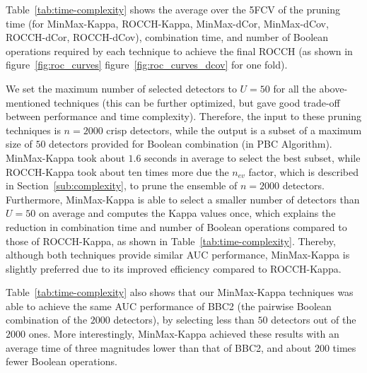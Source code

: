 Table~\ref{tab:time-complexity} shows the average over the 5FCV of the  pruning time (for MinMax-Kappa,  ROCCH-Kappa, MinMax-dCor, MinMax-dCov, ROCCH-dCor, ROCCH-dCov), combination time, and number of Boolean operations required by each technique to achieve the final ROCCH (as shown in  figure~\ref{fig:roc_curves} figure~\ref{fig:roc_curves_dcov} for one fold).  

We set the maximum number of selected detectors to $U=50$ for all the above-mentioned techniques (this can be further optimized, but gave good trade-off between performance and time complexity).
Therefore, the input to these pruning techniques is $n=2000$ crisp detectors, while the output is a subset of a maximum size of $50$ detectors provided for Boolean combination (in PBC Algorithm).
MinMax-Kappa took about $1.6$ seconds in average to select the best subset, while ROCCH-Kappa took about ten times more due the $n_{ev}$ factor, which is described in Section~\ref{sub:complexity}, to prune the ensemble of $n=2000$ detectors.
Furthermore, MinMax-Kappa is able to select a smaller number of detectors than $U=50$ on average and computes the Kappa values once, which explains the reduction in combination time and number of Boolean operations compared to those of ROCCH-Kappa, as shown in Table~\ref{tab:time-complexity}.
Thereby, although both techniques provide similar AUC performance, MinMax-Kappa is slightly preferred due to its improved efficiency  compared to ROCCH-Kappa.

Table~\ref{tab:time-complexity} also shows that our MinMax-Kappa techniques was able to achieve the same AUC performance of BBC2 (the pairwise Boolean combination of the $2000$ detectors), by selecting less than $50$ detectors out of the $2000$ ones.
More interestingly, MinMax-Kappa achieved these results with an average time of three magnitudes lower than that of BBC2, and about 200 times fewer Boolean operations.

